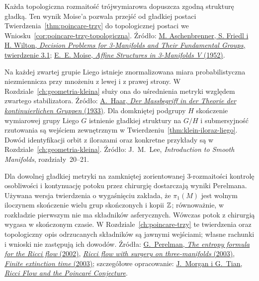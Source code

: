 \begin{description}[leftmargin=2.9cm,style=nextline]
\item[Wygładzanie rozmaitości trójwymiarowych.]
  Każda topologiczna rozmaitość trójwymiarowa dopuszcza
  zgodną strukturę gładką. Ten wynik Moise'a
  pozwala przejść od gładkiej postaci
  Twierdzenia~\ref{thm:poincare-trzy}
  do topologicznej postaci we
  Wniosku~\ref{cor:poincare-trzy-topologiczna}.
  Źródło: \href{https://msp.org/gtm/2015/19-1/gtm-v19-n1-p08-s.pdf}
  {M. Aschenbrenner, S. Friedl i H. Wilton,
  \emph{Decision Problems for 3-Manifolds and Their
  Fundamental Groups}, twierdzenie 3.1};
  \href{https://doi.org/10.2307/1969769}
  {E.~E. Moise, \emph{Affine Structures in
  3-Manifolds V} (1952)}.

\item[Miara Haara i ilorazy grup Liego.]
  Na każdej zwartej grupie Liego istnieje znormalizowana
  miara probabilistyczna niezmiennicza przy mnożeniu
  z lewej i z prawej strony. W
  Rozdziale~\ref{ch:geometria-kleina} służy ona do
  uśrednienia metryki względem zwartego stabilizatora.
  Źródło:
  \href{https://doi.org/10.2307/1968346}
  {A.\ Haar, \emph{Der Massbegriff in der Theorie der
  kontinuierlichen Gruppen} (1933)}.
  Dla domkniętej podgrupy $H$ skończenie wymiarowej
  grupy Liego $G$ istnienie gładkiej struktury na
  $G/H$ i submersyjność rzutowania są wejściem
  zewnętrznym w
  Twierdzeniu~\ref{thm:klein-iloraz-liego}.
  Dowód identyfikacji orbit z ilorazami oraz
  konkretne przykłady są w
  Rozdziale~\ref{ch:geometria-kleina}.
  Źródło: J.\ M.\ Lee, \emph{Introduction to Smooth
  Manifolds}, rozdziały~20--21.

\item[Potok Ricciego z chirurgią i wygaśnięcie.]
  Dla dowolnej gładkiej metryki na zamkniętej
  zorientowanej $3$-rozmaitości kontrolę osobliwości
  i kontynuację potoku przez chirurgię dostarczają
  wyniki Perelmana. Używana wersja twierdzenia o
  wygaśnięciu zakłada, że $\pi_1(M)$ jest wolnym
  iloczynem skończenie wielu grup skończonych i kopii
  $\mathbb{Z}$; równoważnie, w rozkładzie pierwszym nie ma
  składników asferycznych. Wówczas potok z chirurgią
  wygasa w skończonym czasie.
  W Rozdziale~\ref{ch:poincare-trzy} te twierdzenia
  oraz topologiczny opis odrzucanych składników
  są jawnymi wejściami; własne rachunki i wnioski
  nie zastępują ich dowodów. Źródła:
  \href{https://arxiv.org/pdf/math/0211159}
  {G.\ Perelman, \emph{The entropy formula for the Ricci flow} (2002)},
  \href{https://arxiv.org/pdf/math/0303109}
  {\emph{Ricci flow with surgery on three-manifolds} (2003)},
  \href{https://arxiv.org/pdf/math/0307245}
  {\emph{Finite extinction time} (2003)};
  szczegółowe opracowanie:
  \href{https://www.claymath.org/wp-content/uploads/2022/03/Ricci-pdf.pdf}
  {J.\ Morgan i G.\ Tian, \emph{Ricci Flow and the Poincaré Conjecture}}.


\end{description}

